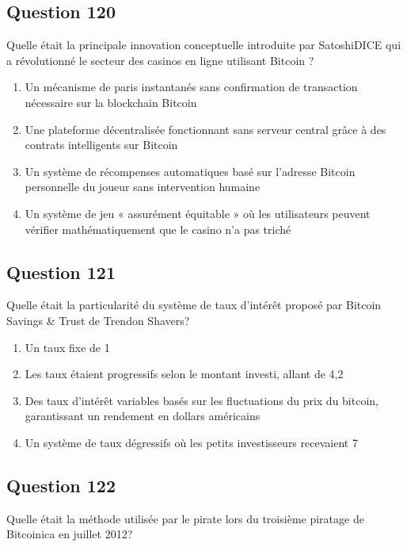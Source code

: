 \documentclass[12pt,a4paper]{article}
\begin{document}
\bigskip


\subsection*{Question 120}
Quelle était la principale innovation conceptuelle introduite par SatoshiDICE qui a révolutionné le secteur des casinos en ligne utilisant Bitcoin ?

\begin{enumerate}[label=\Alph*., leftmargin=*]
\item Un mécanisme de paris instantanés sans confirmation de transaction nécessaire sur la blockchain Bitcoin
\item Une plateforme décentralisée fonctionnant sans serveur central grâce à des contrats intelligents sur Bitcoin
\item Un système de récompenses automatiques basé sur l'adresse Bitcoin personnelle du joueur sans intervention humaine
\item Un système de jeu « assurément équitable » où les utilisateurs peuvent vérifier mathématiquement que le casino n'a pas triché
\end{enumerate}

\bigskip


\subsection*{Question 121}
Quelle était la particularité du système de taux d'intérêt proposé par Bitcoin Savings & Trust de Trendon Shavers?

\begin{enumerate}[label=\Alph*., leftmargin=*]
\item Un taux fixe de 1%
\item Les taux étaient progressifs selon le montant investi, allant de 4,2%
\item Des taux d'intérêt variables basés sur les fluctuations du prix du bitcoin, garantissant un rendement en dollars américains
\item Un système de taux dégressifs où les petits investisseurs recevaient 7%
\end{enumerate}

\bigskip


\subsection*{Question 122}
Quelle était la méthode utilisée par le pirate lors du troisième piratage de Bitcoinica en juillet 2012?
\end{document}
